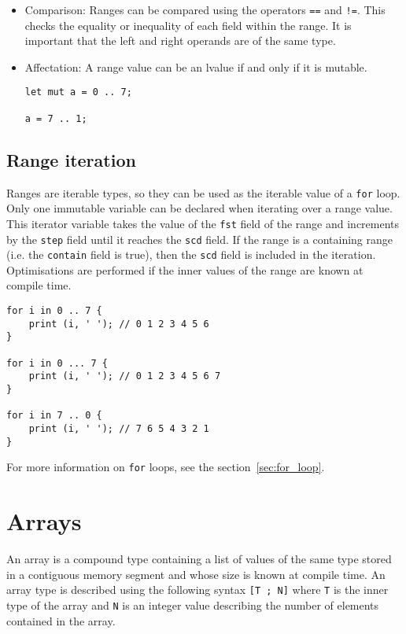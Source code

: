 \begin{itemize}
\item Comparison: Ranges can be compared using the operators \texttt{==} and
  \texttt{!=}. This checks the equality or inequality of each field within the
  range. It is important that the left and right operands are of the same type.

\item Affectation: A range value can be an lvalue if and only if it is mutable.
  \begin{lstlisting}[style=coloredverbatim]
let mut a = 0 .. 7;

a = 7 .. 1;
  \end{lstlisting}

\end{itemize}

\subsection {Range iteration}

 Ranges are iterable types, so they can be used as the iterable value of a
 \texttt{for} loop. Only one immutable variable can be declared when iterating
 over a range value. This iterator variable takes the value of the \texttt{fst}
 field of the range and increments by the \texttt{step} field until it reaches
 the \texttt{scd} field. If the range is a containing range (i.e. the
 \texttt{contain} field is true), then the \texttt{scd} field is included in
 the iteration. Optimisations are performed if the inner values of the range are
 known at compile time.

\begin{lstlisting}[style=coloredverbatim]
for i in 0 .. 7 {
    print (i, ' '); // 0 1 2 3 4 5 6
}

for i in 0 ... 7 {
    print (i, ' '); // 0 1 2 3 4 5 6 7
}

for i in 7 .. 0 {
    print (i, ' '); // 7 6 5 4 3 2 1
}
\end{lstlisting}

 For more information on \texttt{for} loops, see the section~\ref{sec:for_loop}.

\section{Arrays}

 An array is a compound type containing a list of values of the same type stored
 in a contiguous memory segment and whose size is known at compile time. An
 array type is described using the following syntax \texttt{[T ; N]} where
 \texttt{T} is the inner type of the array and \texttt{N} is an integer value
 describing the number of elements contained in the array.

